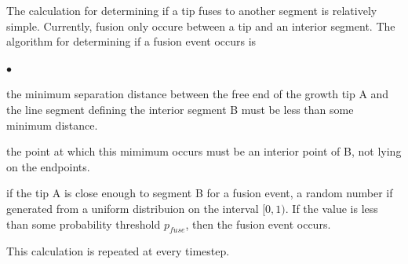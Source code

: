 \documentclass[12pt]{article}
\begin{document}
The calculation for determining if a tip fuses to another segment is relatively
simple. Currently, fusion only occure between a tip and an interior segment. The
algorithm for determining if a fusion event occurs is
\begin{list}{$\bullet$}{}
\item the minimum separation distance between the free end of the growth tip A
and the line segment defining the interior segment B must be less than some
minimum distance.
\item the point at which this mimimum occurs must be an interior point of B, not
lying on the endpoints.
\item if the tip A is close enough to segment B for a fusion event, a random
number if generated from a uniform distribuion on the interval $[0,1)$. If the value 
is less than some probability threshold $p_{fuse}$, then the fusion event occurs.
\end{list}
This calculation is repeated at every timestep.


\end{document}

